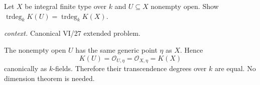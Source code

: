\begin{problem}\label{prob:vi27-p17}
Let \(X\) be integral finite type over \(k\) and \(U\subseteq X\) nonempty open. Show \(\operatorname{trdeg}_kK(U)=\operatorname{trdeg}_kK(X)\).
\par\smallskip\noindent\textit{context.} Canonical VI/27 extended problem.
\end{problem}

\ifdefined\FullProblemDossiers
\begin{solution}
The nonempty open \(U\) has the same generic point \(\eta\) as \(X\). Hence
\[
K(U)=\mathcal O_{U,\eta}=\mathcal O_{X,\eta}=K(X)
\]
canonically as \(k\)-fields. Therefore their transcendence degrees over \(k\) are equal. No dimension theorem is
needed.
\end{solution}
\fi
